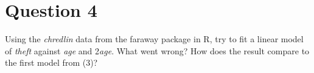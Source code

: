 \section{Question 4}

\begin{question}
    Using the \textit{chredlin} data from the faraway package in R, try to fit a linear model of \textit{theft} against \textit{age} and 2\textit{age}. What went wrong? How does the result compare to the first model from (3)?
\end{question}

\begin{answer}
    
\end{answer}
